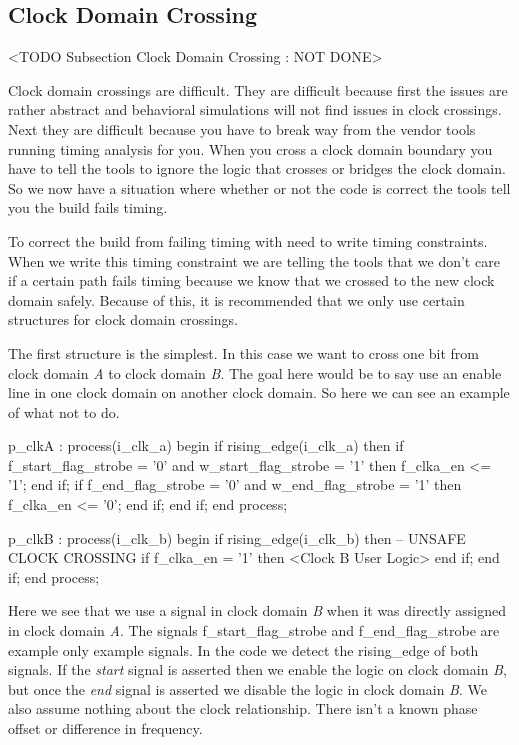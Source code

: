 \subsection{Clock Domain Crossing}
	<TODO Subsection Clock Domain Crossing : NOT DONE>
	
Clock domain crossings are difficult. They are difficult because first the issues are rather abstract and behavioral simulations will not find issues in clock crossings. Next they are difficult because you have to break way from the vendor tools running timing analysis for you. When you cross a clock domain boundary you have to tell the tools to ignore the logic that crosses or bridges the clock domain. So we now have a situation where whether or not the code is correct the tools tell you the build fails timing. 

To correct the build from failing timing with need to write timing constraints. When we write this timing constraint we are telling the tools that we don't care if a certain path fails timing because we know that we crossed to the new clock domain safely. Because of this, it is recommended that we only use certain structures for clock domain crossings. 
	
The first structure is the simplest. In this case we want to cross one bit from clock domain \emph{A} to clock domain \emph{B}. The goal here would be to say use an enable line in one clock domain on another clock domain. So here we can see an example of what not to do. 

\begin{VHDLlisting}[tabsize=8]
p_clkA : process(i_clk_a)
begin
	if rising_edge(i_clk_a) then
		if f_start_flag_strobe = '0' and w_start_flag_strobe = '1' then
			f_clka_en <= '1';
		end if;
		if f_end_flag_strobe = '0' and w_end_flag_strobe = '1' then
			f_clka_en <= '0';
		end if;
	end if;
end process;

p_clkB : process(i_clk_b)
begin
	if rising_edge(i_clk_b) then
		-- UNSAFE CLOCK CROSSING
		if f_clka_en = '1' then
			<Clock B User Logic>
		end if;
	end if;
end process;
\end{VHDLlisting}	
	
Here we see that we use a signal in clock domain \emph{B} when it was directly assigned in clock domain \emph{A}. The signals f\_start\_flag\_strobe and f\_end\_flag\_strobe are example only example signals. In the code we detect the rising\_edge of both signals. If the \emph{start} signal is asserted then we enable the logic on clock domain \emph{B}, but once the \emph{end} signal is asserted we disable the logic in clock domain \emph{B}. We also assume nothing about the clock relationship. There isn't a known phase offset or difference in frequency. 

